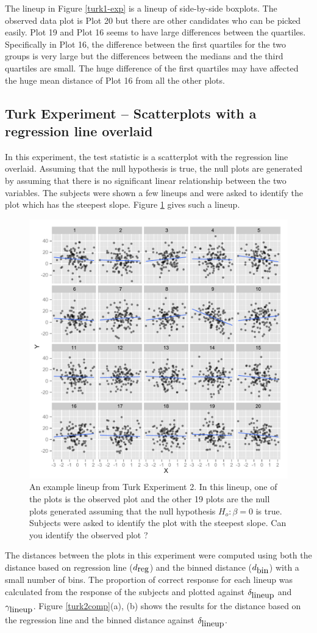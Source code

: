\documentclass[12]{article}
\begin{document}
The lineup in Figure \ref{turk1-exp} is a lineup of side-by-side boxplots. The observed data plot is Plot 20 but there are other candidates who can be picked easily. Plot 19 and Plot 16 seems to have large differences between the quartiles. Specifically in Plot 16, the difference between the  
first quartiles for the two groups is very large but the differences between the medians and the third quartiles are small. The huge difference of the first quartiles may have affected the huge mean distance of Plot 16 from all the other plots.   

\subsection{Turk Experiment -- Scatterplots with a regression line overlaid}

In this experiment, the test statistic is a scatterplot with the regression line overlaid. Assuming that the null hypothesis is true, the null plots are generated by assuming that there is no significant linear relationship between the two variables. The subjects were shown a few lineups and were asked to identify the plot which has the steepest slope. Figure \ref{turk2} gives such a lineup. 

\begin{figure}[htbp]
\centering
\includegraphics[width=.5\textwidth]{turk2-example.pdf}
\caption{An example lineup from Turk Experiment 2. In this lineup, one of the plots is the observed plot and the other 19 plots are the null plots generated assuming that the null hypothesis $H_o : \beta = 0$ is true. Subjects were asked to identify the plot with the steepest slope. Can you identify the observed plot ?}
\label{turk2}
\end{figure}

The distances between the plots in this experiment were computed using both the distance based on regression line ($d_{\hbox{reg}}$) and the binned distance ($d_{\hbox{bin}}$) with a small number of bins. The proportion of correct response for each lineup was calculated from the response of the subjects and plotted against $\delta_{\hbox{lineup}}$ and $\gamma_{\hbox{lineup}}$.  Figure \ref{turk2comp}(a), (b) shows the results for the distance based on the regression line and the binned distance against $\delta_{\hbox{lineup}}$.
\end{document}
